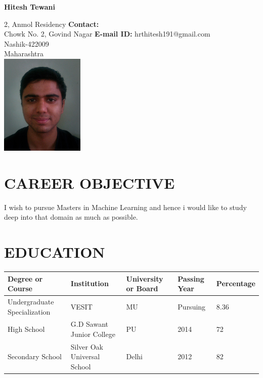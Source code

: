 \documentclass{article}
\newcommand{\name}[1]{
                \centerline{\Huge{#1}}
}
\begin{document}
\name{\textbf{Hitesh Tewani}}

\makebox[\linewidth]{\rule{\paperwidth}{2.4pt}}




 
\begin{flushleft}
                {2, Anmol Residency} \noindent\hspace{245}\textbf{Contact:} %
                \\{Chowk No. 2, Govind Nagar} \hfill \textbf{E-mail ID:} hrthitesh191@gmail.com
                \\{Nashik-422009} 
                \\{Maharashtra}
                \\\hfill\includegraphics[width=4cm]{Hitesh}
\end{flushleft}





\section{CAREER OBJECTIVE}
{\selectfont
I wish to pursue Masters in Machine Learning and hence i would like to study deep into that domain as much as possible. 
}
\section{EDUCATION}

 
\setlength{\arrayrulewidth}{.1mm}
\setlength{\tabcolsep}{18pt}
\renewcommand{\arraystretch}{1.5}
 
\begin{tabular}{ |p{3cm}|p{3cm}|p{2cm}|p{2cm}|p{2cm}|  }
\hline

\hline
Degree or  Course & Institution & University or Board & Passing Year & Percentage\\
\hline
Undergraduate Specialization& VESIT& MU &Pursuing& 8.36 \\
High School & G.D Sawant Junior College & PU& 2014 &72\\
Secondary School & Silver Oak Universal School & Delhi& 2012 & 82\\

\hline
\end{tabular}
\end{document}
